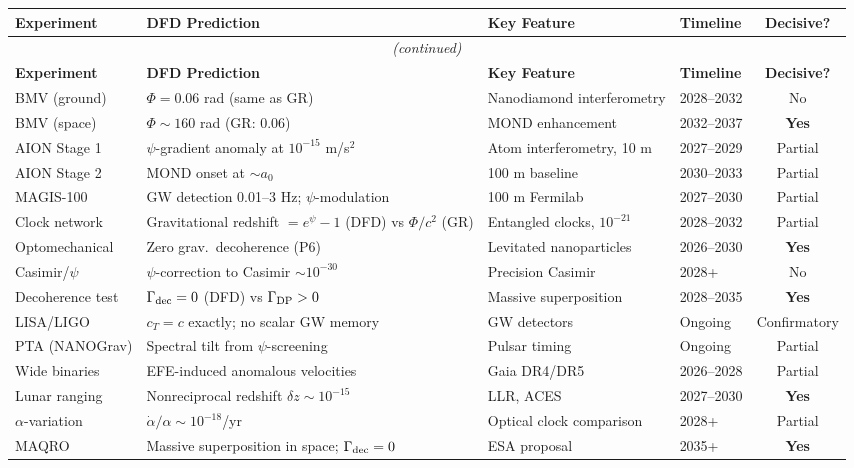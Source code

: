 \documentclass[11pt,a4paper]{article}
\begin{document}
\begin{center}
\begin{longtable}{p{2.5cm}p{3cm}p{3.5cm}p{2cm}c}
\toprule
\textbf{Experiment} & \textbf{DFD Prediction} & \textbf{Key Feature} & \textbf{Timeline} & \textbf{Decisive?} \\
\midrule
\endfirsthead
\multicolumn{5}{c}{\textit{(continued)}} \\
\toprule
\textbf{Experiment} & \textbf{DFD Prediction} & \textbf{Key Feature} & \textbf{Timeline} & \textbf{Decisive?} \\
\midrule
\endhead

BMV (ground) & $\Phi = 0.06$ rad (same as GR) & Nanodiamond interferometry & 2028--2032 & No \\
\midrule
BMV (space) & $\Phi \sim 160$ rad (GR: 0.06) & MOND enhancement & 2032--2037 & \textbf{Yes} \\
\midrule
AION Stage 1 & $\psi$-gradient anomaly at $10^{-15}$ m/s$^2$ & Atom interferometry, 10 m & 2027--2029 & Partial \\
\midrule
AION Stage 2 & MOND onset at $\sim a_0$ & 100 m baseline & 2030--2033 & Partial \\
\midrule
MAGIS-100 & GW detection 0.01--3 Hz; $\psi$-modulation & 100 m Fermilab & 2027--2030 & Partial \\
\midrule
Clock network & Gravitational redshift $= e^\psi - 1$ (DFD) vs $\Phi/c^2$ (GR) & Entangled clocks, $10^{-21}$ & 2028--2032 & Partial \\
\midrule
Optomechanical & Zero grav.\ decoherence (P6) & Levitated nanoparticles & 2026--2030 & \textbf{Yes} \\
\midrule
Casimir/$\psi$ & $\psi$-correction to Casimir $\sim 10^{-30}$ & Precision Casimir & 2028+ & No \\
\midrule
Decoherence test & $\Gamma_{\rm dec} = 0$ (DFD) vs $\Gamma_{\rm DP} > 0$ & Massive superposition & 2028--2035 & \textbf{Yes} \\
\midrule
LISA/LIGO & $c_T = c$ exactly; no scalar GW memory & GW detectors & Ongoing & Confirmatory \\
\midrule
PTA (NANOGrav) & Spectral tilt from $\psi$-screening & Pulsar timing & Ongoing & Partial \\
\midrule
Wide binaries & EFE-induced anomalous velocities & Gaia DR4/DR5 & 2026--2028 & Partial \\
\midrule
Lunar ranging & Nonreciprocal redshift $\delta z \sim 10^{-15}$ & LLR, ACES & 2027--2030 & \textbf{Yes} \\
\midrule
$\alpha$-variation & $\dot\alpha/\alpha \sim 10^{-18}$/yr & Optical clock comparison & 2028+ & Partial \\
\midrule
MAQRO & Massive superposition in space; $\Gamma_{\rm dec} = 0$ & ESA proposal & 2035+ & \textbf{Yes} \\
\bottomrule
\end{longtable}
\end{center}
\end{document}
